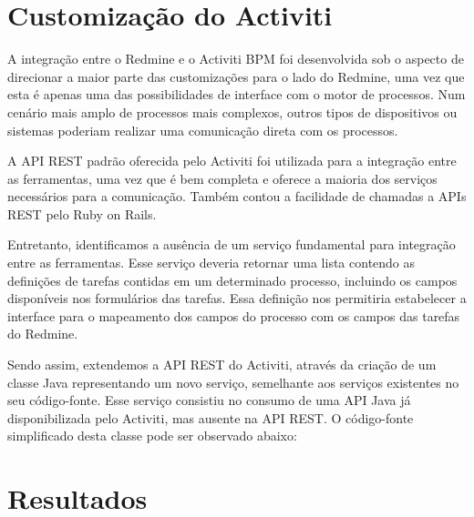 \section{Customização do Activiti}\label{sec:integracao_redmine_activiti-implementacao-activiti}

A integração entre o Redmine e o Activiti BPM foi desenvolvida sob o aspecto de direcionar a maior parte das customizações para o lado do Redmine, uma vez que esta é apenas uma das possibilidades de interface com o motor de processos. Num cenário mais amplo de processos mais complexos, outros tipos de dispositivos ou sistemas poderiam realizar uma comunicação direta com os processos.

A API REST padrão oferecida pelo Activiti foi utilizada para a integração entre as ferramentas, uma vez que é bem completa e oferece a maioria dos serviços necessários para a comunicação. Também contou a facilidade de chamadas a APIs REST pelo Ruby on Rails. 

Entretanto, identificamos a ausência de um serviço fundamental para integração entre as ferramentas. Esse serviço deveria retornar uma lista contendo as definições de tarefas contidas em um determinado processo, incluindo os campos disponíveis nos formulários das tarefas. Essa definição nos permitiria estabelecer a interface para o mapeamento dos campos do processo com os campos das tarefas do Redmine.

Sendo assim, extendemos a API REST do Activiti, através da criação de um classe Java representando um novo serviço, semelhante aos serviços existentes no seu código-fonte. Esse serviço consistiu no consumo de uma API Java já disponibilizada pelo Activiti, mas ausente na API REST. O código-fonte simplificado desta classe pode ser observado abaixo:


\section{Resultados}\label{sec:integracao_redmine_activiti-resultados}